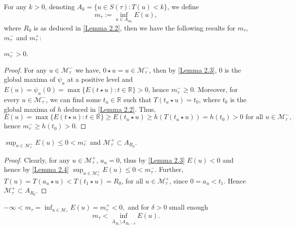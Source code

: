 \documentclass[11pt]{article}
\numberwithin{equation}{section}
\numberwithin{mytheorem}{section}
\begin{document}
		For any $k>0$, denoting $A_k=\{u\in S(\tau): T(u)<k\}$, we define 
		$$m_{\tau}:=\displaystyle \inf_{u\in A_{R_0}}E(u),$$ 
		where $R_0$ is as deduced in \autoref{Lemma 2.2},
		then we have the following results for $m_{\tau}$, $m_{\tau}^-$ and $m_{\tau}^+$:
		\begin{lemma}\label{Lemma 2.4}
			$m_{\tau}^->0.$
		\end{lemma}
		\begin{proof}
			For any $u\in \mathcal{M}_{\tau}^-$ we have, $0\star u= u\in \mathcal{M}_{\tau}^-$, then by \autoref{Lemma 2.3},  $0$ is the global maxima of $\psi_u$ at a positive level and	$E(u)=\psi_{u}(0)=\max\{E(t\star u): t\in \mathbb{R}\}>0$, hence $m_{\tau}^-\geq 0$. Moreover, for every $u\in \mathcal{M}_{\tau}^-$, we can find some $t_u\in \mathbb{R}$ such that $T(t_u\star u)=t_0$, where $t_0$ is the global maxima of $h$ deduced in \autoref{Lemma 2.2}. Thus,
			$$E(u)=\max\{E(t\star u): t\in \mathbb{R}\}\geq E(t_u\star u)\geq h(T(t_u\star u))=h(t_0)>0 \text{ for all } u\in \mathcal{M}_{\tau}^-,$$
			hence $m_{\tau}^-\geq h(t_0)>0$.
		\end{proof}
		\begin{lemma}\label{Lemma 2.5}
			$\displaystyle \sup_{u\in \mathcal{M}_{\tau}^+}E(u)\leq 0 < m_{\tau}^-$ and $\mathcal{M}_{\tau}^+\subset A_{R_0}$.
		\end{lemma}
		\begin{proof}
			Clearly, for any $u\in \mathcal{M}_{\tau}^+$, $a_u=0$, thus by \autoref{Lemma 2.3} $E(u)<0$ and hence by \autoref{Lemma 2.4} $\displaystyle \sup_{u\in \mathcal{M}_{\tau}^+}E(u)\leq 0 <m_{\tau}^-$. Further, $T(u)=T(a_u\star u)<T(t_1 \star u)=R_0$, for all $u\in \mathcal{M}_{\tau}^+$, since $0=a_u<t_1$. Hence $\mathcal{M}_{\tau}^+\subset A_{R_0}$.
		\end{proof}
		\begin{lemma}\label{Lemma 2.6}$\displaystyle -\infty <m_{\tau}=\inf_{u\in \mathcal{M}_{\tau}}E(u)=m_{\tau}^+<0,$ and
			for $\delta>0$ small enough
			\begin{equation}\label{2.4}
				m_{\tau}<\displaystyle \inf_{\bar{A}_{R_0}\setminus A_{R_0-\delta}}E(u).
			\end{equation}
		\end{lemma}
\end{document}
